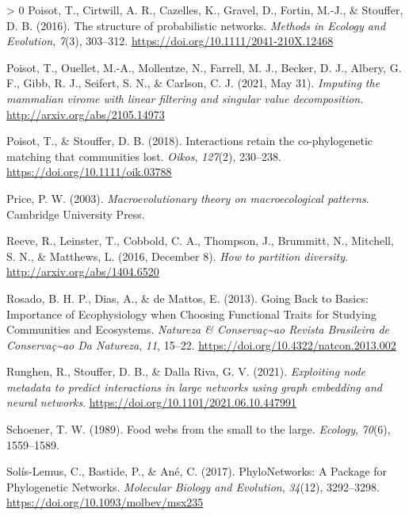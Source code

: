 \documentclass[11pt]{article}
\newlength{\cslhangindent}
\newenvironment{CSLReferences}[3] %
 {%
  \setlength{\parindent}{0pt}
  \ifodd #1 \everypar{\setlength{\hangindent}{\cslhangindent}}\ignorespaces\fi
  \ifnum #2 > 0
  \setlength{\parskip}{#2\baselineskip}
  \fi
 }%
 {}
\begin{document}
\begin{CSLReferences}{1}{0}
\leavevmode\hypertarget{ref-Poisot2016StrPro}{}%
Poisot, T., Cirtwill, A. R., Cazelles, K., Gravel, D., Fortin, M.-J., \&
Stouffer, D. B. (2016). The structure of probabilistic networks.
\emph{Methods in Ecology and Evolution}, \emph{7}(3), 303--312.
\url{https://doi.org/10.1111/2041-210X.12468}

\leavevmode\hypertarget{ref-Poisot2021ImpMam}{}%
Poisot, T., Ouellet, M.-A., Mollentze, N., Farrell, M. J., Becker, D.
J., Albery, G. F., Gibb, R. J., Seifert, S. N., \& Carlson, C. J. (2021,
May 31). \emph{Imputing the mammalian virome with linear filtering and
singular value decomposition}. \url{http://arxiv.org/abs/2105.14973}

\leavevmode\hypertarget{ref-Poisot2018IntRet}{}%
Poisot, T., \& Stouffer, D. B. (2018). Interactions retain the
co-phylogenetic matching that communities lost. \emph{Oikos},
\emph{127}(2), 230--238. \url{https://doi.org/10.1111/oik.03788}

\leavevmode\hypertarget{ref-Price2003MacThe}{}%
Price, P. W. (2003). \emph{Macroevolutionary theory on macroecological
patterns}. Cambridge University Press.

\leavevmode\hypertarget{ref-Reeve2016HowPar}{}%
Reeve, R., Leinster, T., Cobbold, C. A., Thompson, J., Brummitt, N.,
Mitchell, S. N., \& Matthews, L. (2016, December 8). \emph{How to
partition diversity}. \url{http://arxiv.org/abs/1404.6520}

\leavevmode\hypertarget{ref-Rosado2013GoiBac}{}%
Rosado, B. H. P., Dias, A., \& de Mattos, E. (2013). Going Back to
Basics: Importance of Ecophysiology when Choosing Functional Traits for
Studying Communities and Ecosystems. \emph{Natureza \&
Conservaç\textasciitilde ao Revista Brasileira de
Conservaç\textasciitilde ao Da Natureza}, \emph{11}, 15--22.
\url{https://doi.org/10.4322/natcon.2013.002}

\leavevmode\hypertarget{ref-Runghen2021ExpNod}{}%
Runghen, R., Stouffer, D. B., \& Dalla Riva, G. V. (2021).
\emph{Exploiting node metadata to predict interactions in large networks
using graph embedding and neural networks}.
\url{https://doi.org/10.1101/2021.06.10.447991}

\leavevmode\hypertarget{ref-Schoener1989FooWeb}{}%
Schoener, T. W. (1989). Food webs from the small to the large.
\emph{Ecology}, \emph{70}(6), 1559--1589.

\leavevmode\hypertarget{ref-Solis-Lemus2017PhyPac}{}%
Solís-Lemus, C., Bastide, P., \& Ané, C. (2017). PhyloNetworks: A
Package for Phylogenetic Networks. \emph{Molecular Biology and
Evolution}, \emph{34}(12), 3292--3298.
\url{https://doi.org/10.1093/molbev/msx235}


\end{CSLReferences}
\end{document}
